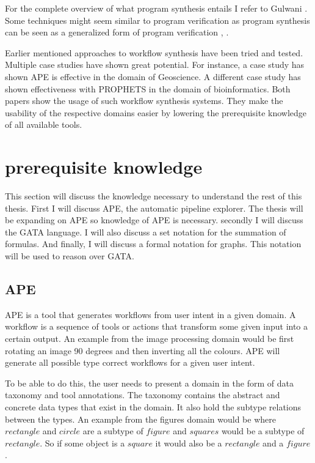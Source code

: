 \documentclass{article}
\begin{document}
For the complete overview of what program synthesis entails I refer to Gulwani \cite{program_synthesis}. Some techniques might seem similar to program verification as program synthesis can be seen as a generalized form of program verification \cite{gulwani2011loopfree}, \cite{verificationToSynthesis}.


Earlier mentioned approaches to workflow synthesis have been tried and tested. Multiple case studies have shown great potential. For instance, a case study \cite{kasalica2019workflow} has shown APE is effective in the domain of Geoscience. A different case study \cite{palmblad2019automated} has shown effectiveness with PROPHETS in the domain of bioinformatics. Both papers show the usage of such workflow synthesis systems. They make the usability of the respective domains easier by lowering the prerequisite knowledge of all available tools. 

\section{prerequisite knowledge}
This section will discuss the knowledge necessary to understand the rest of this thesis. First I will discuss APE, the automatic pipeline explorer. The thesis will be expanding on APE so knowledge of APE is necessary. secondly I will discuss the GATA language. I will also discuss a set notation for the summation of formulas. And finally, I will discuss a formal notation for graphs. This notation will be used to reason over GATA. 


\subsection{APE}
APE is a tool that generates workflows from user intent in a given domain. A workflow is a sequence of tools or actions that transform some given input into a certain output. An example from the image processing domain would be first rotating an image 90 degrees and then inverting all the colours. APE will generate all possible type correct workflows for a given user intent.

To be able to do this, the user needs to present a domain in the form of data taxonomy and tool annotations. The taxonomy contains the abstract and concrete data types that exist in the domain. It also hold the subtype relations between the types. An example from the figures domain would be where $rectangle$ and $circle$ are a subtype of $figure$ and $squares$ would be a subtype of $rectangle$. So if some object is a $square$ it would also be a $rectangle$ and a $figure$. 
\end{document}
